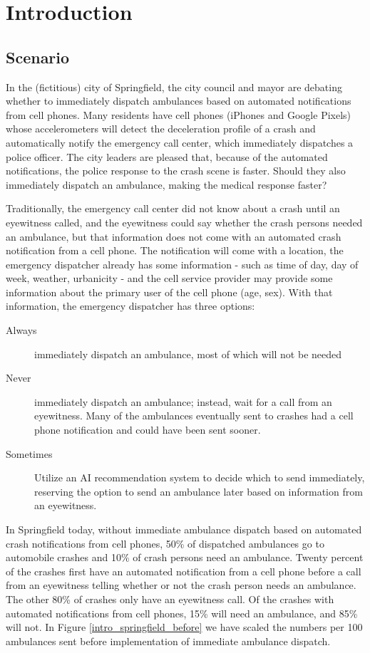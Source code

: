 \section{Introduction}
\label{intro}

\subsection{Scenario}
\label{intro_scenario}

In the (fictitious) city of Springfield, the city council and mayor are debating whether to immediately dispatch ambulances based on automated notifications from cell phones.  Many residents have cell phones (iPhones and Google Pixels) whose accelerometers will detect the deceleration profile of a crash and automatically notify the emergency call center, which immediately dispatches a police officer.  The city leaders are pleased that, because of the automated notifications, the police response to the crash scene is faster.  Should they also immediately dispatch an ambulance, making the medical response faster?

Traditionally, the emergency call center did not know about a crash until an eyewitness called, and the eyewitness could say whether the crash persons needed an ambulance, but that information does not come with an automated crash notification from a cell phone. The notification will come with a location, the emergency dispatcher already has some information - such as time of day, day of week, weather, urbanicity -  and the cell service provider may provide some information about the primary user of the cell phone (age, sex).  With that information, the emergency dispatcher has three options:

\begin{description}
	\item [Always] immediately dispatch an ambulance, most of which will not be needed
	\item [Never] immediately dispatch an ambulance; instead, wait for a call from an eyewitness.  Many of the ambulances eventually sent to crashes had a cell phone notification and could have been sent sooner.  
	\item [Sometimes]  Utilize an AI recommendation system to decide which to send immediately, reserving the option to send an ambulance later based on information from an eyewitness.  
\end{description}


In Springfield today, without immediate ambulance dispatch based on automated crash notifications from cell phones, 50\% of dispatched ambulances go to automobile crashes and 10\% of crash persons need an ambulance.  Twenty percent of the crashes first have an automated notification from a cell phone before a call from an eyewitness telling whether or not the crash person needs an ambulance.  The other 80\% of crashes only have an eyewitness call.  Of the crashes with automated notifications from cell phones, 15\% will need an ambulance, 
and 85\% will not. 
In Figure \ref{intro_springfield_before} we have scaled the numbers per 100 ambulances sent before implementation of immediate ambulance dispatch.  

